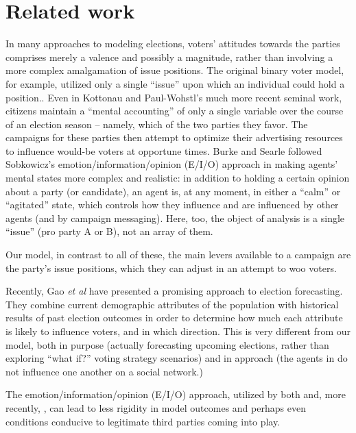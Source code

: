 \section{Related work}
\label{sec:related}


In many approaches to modeling elections, voters' attitudes towards the parties
comprises merely a valence and possibly a magnitude, rather than involving a
more complex amalgamation of issue positions. The original binary voter model,
for example, utilized only a single ``issue'' upon which an individual could
hold a position.\cite{holley_ergodic_1975,clifford_model_1973}. Even in
Kottonau and Paul-Wohstl's much more recent seminal
work\cite{kottonau_simulating_2004}, citizens maintain a ``mental accounting''
of only a single variable over the course of an election season -- namely,
which of the two parties they favor. The campaigns for these parties then
attempt to optimize their advertising resources to influence would-be voters at
opportune times. Burke and Searle\cite{burke_quantitatively_2022} followed
Sobkowicz's emotion/information/opinion (E/I/O)
approach\cite{sobkowicz_quantitative_2016} in making agents' mental states more
complex and realistic: in addition to holding a certain opinion about a party
(or candidate), an agent is, at any moment, in either a ``calm'' or
``agitated'' state, which controls how they influence and are influenced by
other agents (and by campaign messaging). Here, too, the object of analysis is
a single ``issue'' (pro party A or B), not an array of them.

Our model, in contrast to all of these, the main levers available to a campaign
are the party's issue positions, which they can adjust in an attempt to woo
voters.

Recently, Gao \textit{et al}\cite{gao_forecasting_2022} have presented a
promising approach to election forecasting. They combine current demographic
attributes of the population with historical results of past election outcomes
in order to determine how much each attribute is likely to influence voters,
and in which direction. This is very different from our model, both in purpose
(actually forecasting upcoming elections, rather than exploring ``what if?''
voting strategy scenarios) and in approach (the agents in
\cite{gao_forecasting_2022} do not influence one another on a social network.)

The emotion/information/opinion (E/I/O) approach, utilized by both
\cite{sobkowicz_quantitative_2016} and, more recently,
\cite{burke_quantitatively_2022}, can lead to less rigidity in model outcomes
and perhaps even conditions conducive to legitimate third parties coming into
play.
